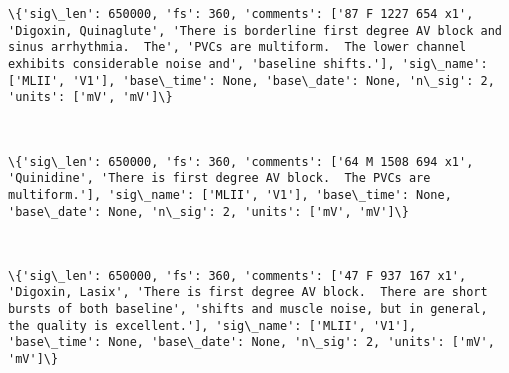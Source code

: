 \documentclass[11pt]{article}
\begin{document}
    \begin{Verbatim}[commandchars=\\\{\}]
\{'sig\_len': 650000, 'fs': 360, 'comments': ['87 F 1227 654 x1', 'Digoxin, Quinaglute', 'There is borderline first degree AV block and sinus arrhythmia.  The', 'PVCs are multiform.  The lower channel exhibits considerable noise and', 'baseline shifts.'], 'sig\_name': ['MLII', 'V1'], 'base\_time': None, 'base\_date': None, 'n\_sig': 2, 'units': ['mV', 'mV']\}

    \end{Verbatim}

    \begin{center}
    \end{center}
    { \hspace*{\fill} \\}
    
    \begin{Verbatim}[commandchars=\\\{\}]
\{'sig\_len': 650000, 'fs': 360, 'comments': ['64 M 1508 694 x1', 'Quinidine', 'There is first degree AV block.  The PVCs are multiform.'], 'sig\_name': ['MLII', 'V1'], 'base\_time': None, 'base\_date': None, 'n\_sig': 2, 'units': ['mV', 'mV']\}

    \end{Verbatim}

    \begin{center}
    \end{center}
    { \hspace*{\fill} \\}
    
    \begin{Verbatim}[commandchars=\\\{\}]
\{'sig\_len': 650000, 'fs': 360, 'comments': ['47 F 937 167 x1', 'Digoxin, Lasix', 'There is first degree AV block.  There are short bursts of both baseline', 'shifts and muscle noise, but in general, the quality is excellent.'], 'sig\_name': ['MLII', 'V1'], 'base\_time': None, 'base\_date': None, 'n\_sig': 2, 'units': ['mV', 'mV']\}

    \end{Verbatim}

    \begin{center}
    \end{center}
    { \hspace*{\fill} \\}
    
\end{document}
